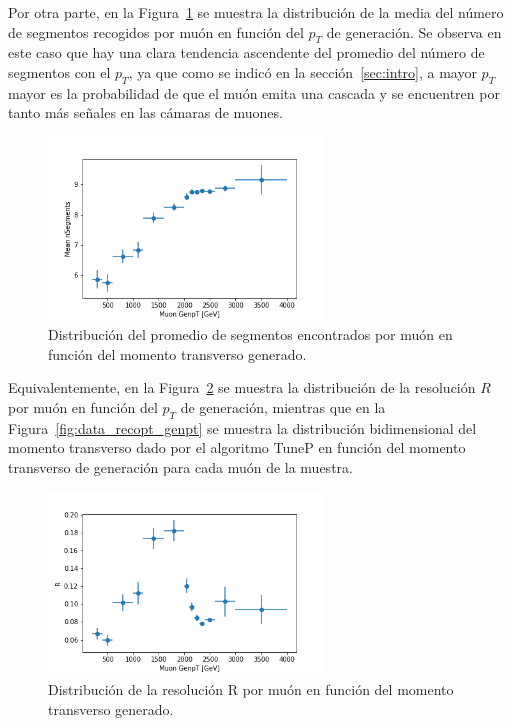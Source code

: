 Por otra parte, en la Figura~\ref{fig:data_nSegmentsMean} se muestra la distribuci\'on de la media del n\'umero de segmentos recogidos por mu\'on en funci\'on del $p_{T}$ de generaci\'on. Se observa en este caso que hay una clara tendencia ascendente del promedio del n\'umero de segmentos con el $p_{T}$, ya que como se indic\'o en la secci\'on~\ref{sec:intro}, a mayor $p_{T}$ mayor es la probabilidad de que el mu\'on emita una cascada y se encuentren por tanto m\'as se\~nales en las c\'amaras de muones. \\


\begin{figure}[h!]
\centering
\includegraphics[width=0.65\textwidth]{figures/data_genpt_MeanNSegments.png}
\caption{Distribuci\'on del promedio de segmentos encontrados por mu\'on en funci\'on del momento transverso generado.}
\label{fig:data_nSegmentsMean}        
\end{figure}

Equivalentemente, en la Figura~\ref{fig:data_R_genpt} se muestra la distribuci\'on de la resoluci\'on $R$ por mu\'on en funci\'on del $p_{T}$ de generaci\'on, mientras que en la Figura~\ref{fig:data_recopt_genpt} se muestra la distribuci\'on bidimensional del momento transverso dado por el algoritmo TuneP en funci\'on del momento transverso de generaci\'on para cada mu\'on de la muestra. \\

\begin{figure}[h!]
\centering
\includegraphics[width=0.65\textwidth]{figures/data_genpt_R.png}
\caption{Distribuci\'on de la resoluci\'on R por mu\'on en funci\'on del momento transverso generado.}
\label{fig:data_R_genpt}        
\end{figure}


